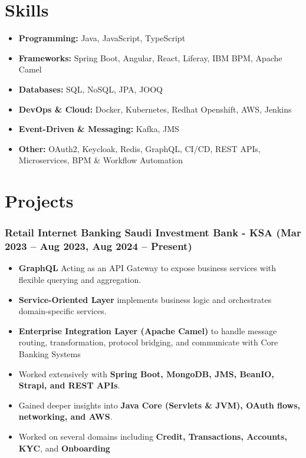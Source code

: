 \documentclass[a4paper,11pt]{article}
\begin{document}
{\section*{{\faStar} Skills}
\begin{itemize}
    \item \textbf{Programming:} Java, JavaScript, TypeScript
    \item \textbf{Frameworks:} Spring Boot, Angular, React, Liferay, IBM BPM, Apache Camel
    \item \textbf{Databases:} SQL, NoSQL, JPA, JOOQ
    \item \textbf{DevOps \& Cloud:} Docker, Kubernetes, Redhat Openshift, AWS, Jenkins
    \item \textbf{Event-Driven \& Messaging:} Kafka, JMS
    \item \textbf{Other:} OAuth2, Keycloak, Redis, GraphQL, CI/CD, REST APIs, Microservices, BPM \& Workflow Automation
\end{itemize}

\section*{{\faPen} Projects}

\subsubsection*{Retail Internet Banking \textbar{} Saudi Investment Bank - KSA (Mar 2023 – Aug 2023, Aug 2024 – Present)}
\begin{itemize}
\item \textbf{GraphQL} Acting as an API Gateway to  expose business services with flexible querying and aggregation.
\item \textbf{Service-Oriented Layer} implements business logic and orchestrates domain-specific services.
\item \textbf{Enterprise Integration Layer (Apache Camel)} to handle message routing, transformation, protocol bridging, and communicate with Core Banking Systems

    \item Worked extensively with \textbf{Spring Boot, MongoDB, JMS, BeanIO, Strapi, and REST APIs}.
    \item Gained deeper insights into \textbf{Java Core (Servlets \& JVM), OAuth flows, networking, and AWS}.
        \item Worked on several domains including \textbf{Credit, Transactions, Accounts, KYC}, and \textbf{Onboarding}
\end{itemize}

}
\end{document}

